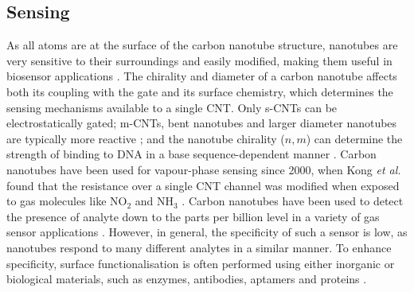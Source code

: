 \documentclass[
  a4paper,
]{scrbook}
\begin{document}
\hypertarget{sec-CNT-sensing-mechanisms}{%
\subsection{Sensing}\label{sec-CNT-sensing-mechanisms}}

As all atoms are at the surface of the carbon nanotube structure,
nanotubes are very sensitive to their surroundings and easily modified,
making them useful in biosensor applications
\autocite{Cao2009,Yao2021,Shkodra2021}. The chirality and diameter of a
carbon nanotube affects both its coupling with the gate and its surface
chemistry, which determines the sensing mechanisms available to a single
CNT. Only s-CNTs can be electrostatically gated; m-CNTs, bent nanotubes
and larger diameter nanotubes are typically more reactive
\autocite{Cao2009,Zhao2012,Chhikara2013,Li2023}; and the nanotube
chirality (\(n, m\)) can determine the strength of binding to DNA in a
base sequence-dependent manner \autocite{Rouhi2011a}. Carbon nanotubes
have been used for vapour-phase sensing since 2000, when Kong \emph{et
al.} found that the resistance over a single CNT channel was modified
when exposed to gas molecules like NO\(_2\) and NH\(_3\)
\autocite{Kong2000}. Carbon nanotubes have been used to detect the
presence of analyte down to the parts per billion level in a variety of
gas sensor applications \autocite{Chen2019,Yao2021}. However, in
general, the specificity of such a sensor is low, as nanotubes respond
to many different analytes in a similar manner. To enhance specificity,
surface functionalisation is often performed using either inorganic or
biological materials, such as enzymes, antibodies, aptamers and proteins
\autocite{Cao2009,Shkodra2021,Yao2021}.
\end{document}
